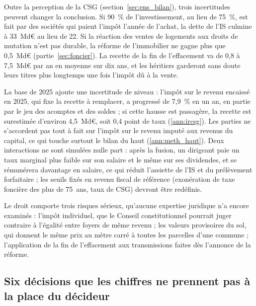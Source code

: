 \documentclass[11pt,a4paper]{article}
\begin{document}
Outre la perception de la CSG (section~\ref{sec:ens_bilan}), trois incertitudes peuvent changer la conclusion. Si 90~\%
de l'investissement, au lieu de 75~\%, est fait par des sociétés qui paient l'impôt l'année de l'achat, la dette de l'IS
culmine à 33~Md€ au lieu de 22. Si la réaction des ventes de logements aux droits de mutation n'est pas durable, la
réforme de l'immobilier ne gagne plus que 0,5~Md€ (partie~\ref{sec:foncier}). La recette de la fin de l'effacement va de
0,8 à 7,5~Md€ par an en moyenne sur dix ans, et les héritiers garderont sans doute leurs titres plus longtemps une fois
l'impôt dû à la vente.

La base de 2025 ajoute une incertitude de niveau : l'impôt sur le revenu encaissé en 2025, qui fixe la recette à
remplacer, a progressé de 7,9~\% en un an, en partie par le jeu des acomptes et des soldes ; si cette hausse est
passagère, la recette est surestimée d'environ 4,5~Md€, soit 0,4 point de taux (\ref{ann:ircsg}). Les parties ne
s'accordent pas tout à fait sur l'impôt sur le revenu imputé aux revenus du capital, ce qui touche surtout le bilan du
haut (\ref{ann:meth_haut}). Deux interactions ne sont simulées nulle part : après la fusion, un dirigeant paie un
taux marginal plus faible sur son salaire et le même sur ses dividendes, et se rémunérera davantage en salaire, ce qui
réduit l'assiette de l'IS et du prélèvement forfaitaire ; les seuils fixés en revenu fiscal de référence (exonération
de taxe foncière des plus de 75~ans, taux de CSG) devront être redéfinis.

Le droit comporte trois risques sérieux, qu'aucune expertise juridique n'a encore examinés : l'impôt individuel, que le
Conseil constitutionnel pourrait juger contraire à l'égalité entre foyers de même revenu ; les valeurs provisoires du
sol, qui donnent le même prix au mètre carré à toutes les parcelles d'une commune ; l'application de la fin de
l'effacement aux transmissions faites dès l'annonce de la réforme.

\subsection{Six décisions que les chiffres ne prennent pas à la place du décideur}\label{sec:ens_decisions}
\end{document}
